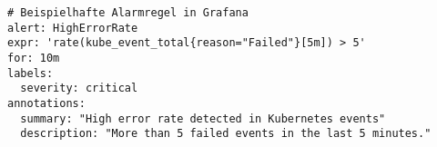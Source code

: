 \begin{verbatim}
# Beispielhafte Alarmregel in Grafana
alert: HighErrorRate
expr: 'rate(kube_event_total{reason="Failed"}[5m]) > 5'
for: 10m
labels:
  severity: critical
annotations:
  summary: "High error rate detected in Kubernetes events"
  description: "More than 5 failed events in the last 5 minutes."
\end{verbatim}